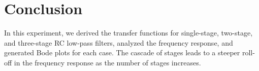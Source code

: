 \documentclass[a4paper,12pt]{article}
\begin{document}
\section{Conclusion}
In this experiment, we derived the transfer functions for single-stage, two-stage, and three-stage RC low-pass filters, analyzed the frequency response, and generated Bode plots for each case. The cascade of stages leads to a steeper roll-off in the frequency response as the number of stages increases.
\end{document}
